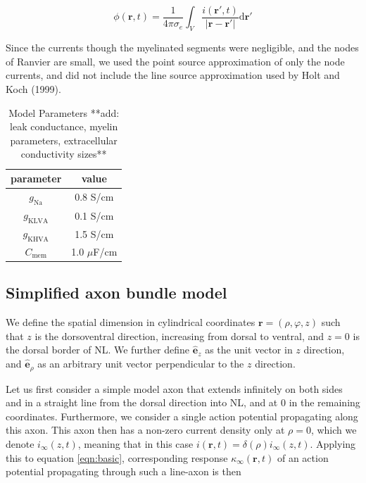 \documentclass[]{article}
\begin{document}
\begin{equation}
  \phi(\mathbf{r},t)=\frac{1}{4\pi\sigma_{e}}\int_{V}\frac{i(\mathbf{r}',t)}{|\mathbf{r}-\mathbf{r}'|}\textrm{d}\mathbf{r}'
  \label{eqn:basic}
\end{equation}

Since the currents though the myelinated segments were negligible, and
the nodes of Ranvier are small, we used the point source approximation
of only the node currents, and did not include the line source
approximation used by Holt and Koch (1999).

\begin{table}[h]
  \begin{centering}
    \begin{tabular}{|c|c|}
      \hline 
      parameter & value\tabularnewline
      \hline 
      \hline 
      $g_{\text{Na}}$ & 0.8 S/cm\texttwosuperior{}\tabularnewline
      \hline 
      $g_{\text{KLVA}}$ & 0.1 S/cm\texttwosuperior{}\tabularnewline
      \hline 
      $g_{\text{KHVA}}$ & 1.5 S/cm\texttwosuperior{}\tabularnewline
      \hline 
      $C_{\text{mem}}$ & 1.0 $\mu$F/cm\texttwosuperior{}\tabularnewline
      \hline 
    \end{tabular}
    \par
  \end{centering}
  \caption{Model Parameters **add: leak conductance, myelin parameters, extracellular conductivity sizes**}
  \label{tab:modparam}
\end{table}

\subsection{Simplified axon bundle
model}\label{simplified-axon-bundle-model}

\label{sec:efpresp}

We define the spatial dimension in cylindrical coordinates
\(\mathbf{r}=(\rho,\varphi,z)\) such that \(z\) is the dorsoventral
direction, increasing from dorsal to ventral, and \(z=0\) is the dorsal
border of NL. We further define \(\hat{\mathbf{e}}_{z}\) as the unit
vector in \(z\) direction, and \(\hat{\mathbf{e}}_{\rho}\) as an
arbitrary unit vector perpendicular to the \(z\) direction.

Let us first consider a simple model axon that extends infinitely on
both sides and in a straight line from the dorsal direction into NL, and
at 0 in the remaining coordinates. Furthermore, we consider a single
action potential propagating along this axon. This axon then has a
non-zero current density only at \(\rho=0\), which we denote
\(i_{\infty}(z,t)\), meaning that in this case
\(i(\mathbf{r},t)=\delta(\rho)i_{\infty}(z,t)\). Applying this to
equation \ref{eqn:basic}, corresponding response
\(\kappa_{\infty}(\mathbf{r},t)\) of an action potential propagating
through such a line-axon is then
\end{document}
